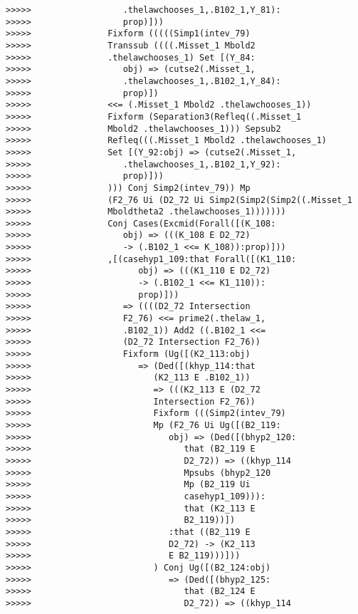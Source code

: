 \documentclass[12pt]{article}
\begin{document}
\begin{verbatim}
>>>>>                  .thelawchooses_1,.B102_1,Y_81):
>>>>>                  prop)]))
>>>>>               Fixform (((((Simp1(intev_79)
>>>>>               Transsub ((((.Misset_1 Mbold2
>>>>>               .thelawchooses_1) Set [(Y_84:
>>>>>                  obj) => (cutse2(.Misset_1,
>>>>>                  .thelawchooses_1,.B102_1,Y_84):
>>>>>                  prop)])
>>>>>               <<= (.Misset_1 Mbold2 .thelawchooses_1))
>>>>>               Fixform (Separation3(Refleq((.Misset_1
>>>>>               Mbold2 .thelawchooses_1))) Sepsub2
>>>>>               Refleq(((.Misset_1 Mbold2 .thelawchooses_1)
>>>>>               Set [(Y_92:obj) => (cutse2(.Misset_1,
>>>>>                  .thelawchooses_1,.B102_1,Y_92):
>>>>>                  prop)]))
>>>>>               ))) Conj Simp2(intev_79)) Mp
>>>>>               (F2_76 Ui (D2_72 Ui Simp2(Simp2(Simp2((.Misset_1
>>>>>               Mboldtheta2 .thelawchooses_1)))))))
>>>>>               Conj Cases(Excmid(Forall([(K_108:
>>>>>                  obj) => (((K_108 E D2_72)
>>>>>                  -> (.B102_1 <<= K_108)):prop)]))
>>>>>               ,[(casehyp1_109:that Forall([(K1_110:
>>>>>                     obj) => (((K1_110 E D2_72)
>>>>>                     -> (.B102_1 <<= K1_110)):
>>>>>                     prop)]))
>>>>>                  => ((((D2_72 Intersection
>>>>>                  F2_76) <<= prime2(.thelaw_1,
>>>>>                  .B102_1)) Add2 ((.B102_1 <<=
>>>>>                  (D2_72 Intersection F2_76))
>>>>>                  Fixform (Ug([(K2_113:obj)
>>>>>                     => (Ded([(khyp_114:that
>>>>>                        (K2_113 E .B102_1))
>>>>>                        => (((K2_113 E (D2_72
>>>>>                        Intersection F2_76))
>>>>>                        Fixform (((Simp2(intev_79)
>>>>>                        Mp (F2_76 Ui Ug([(B2_119:
>>>>>                           obj) => (Ded([(bhyp2_120:
>>>>>                              that (B2_119 E
>>>>>                              D2_72)) => ((khyp_114
>>>>>                              Mpsubs (bhyp2_120
>>>>>                              Mp (B2_119 Ui
>>>>>                              casehyp1_109))):
>>>>>                              that (K2_113 E
>>>>>                              B2_119))])
>>>>>                           :that ((B2_119 E
>>>>>                           D2_72) -> (K2_113
>>>>>                           E B2_119)))]))
>>>>>                        ) Conj Ug([(B2_124:obj)
>>>>>                           => (Ded([(bhyp2_125:
>>>>>                              that (B2_124 E
>>>>>                              D2_72)) => ((khyp_114

\end{verbatim}
\end{document}
